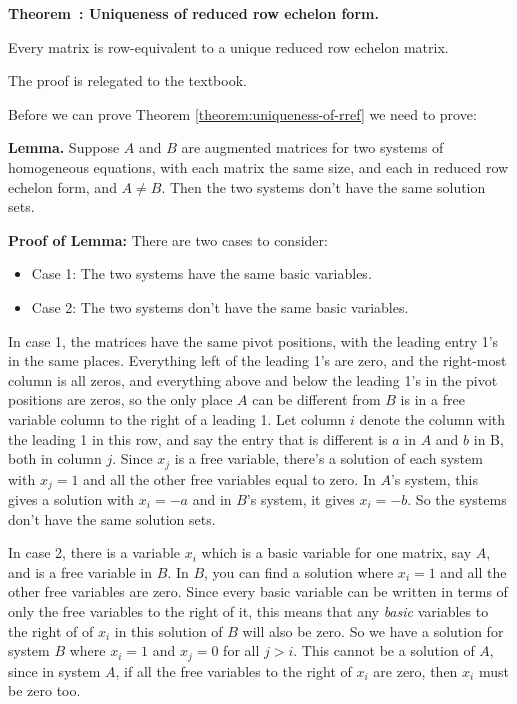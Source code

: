 \documentclass[11pt, letterpaper]{report}
\newenvironment{notes}{}{}
\newenvironment{book}{}{}
\newcounter{theorem}[chapter]
\newenvironment{theorem}[1][]{\refstepcounter{theorem}\begin{bbox}\par
    \noindent\textbf{Theorem~\thetheorem: #1}}{\end{bbox}}
\newlength\oldfboxsep%
\newlength\myminiwidth%
\newenvironment{bbox}{%
  \setlength\oldfboxsep\fboxsep
  \setlength{\fboxsep}{.1in}%
  \setlength\myminiwidth\linewidth%
  \addtolength\myminiwidth{-0.2in}%
  \vspace{0.1in}%
  \begin{lrbox}{\bboxbox}\begin{minipage}{\myminiwidth}%
    }{%
    \end{minipage}\end{lrbox}%
  \noindent\fbox{\usebox{\bboxbox}}\vspace{0.1in}\setlength\fboxsep\oldfboxsep%
}
\begin{document}
\begin{theorem}[Uniqueness of reduced row echelon form.] 
\label{theorem:uniqueness-of-rref}

Every matrix is row-equivalent to a unique reduced row echelon matrix.
\end{theorem}

\begin{notes}
The proof is relegated to the textbook.
\end{notes}

\begin{book}
Before we can prove Theorem \ref{theorem:uniqueness-of-rref} we need to prove:

\textbf{Lemma. } Suppose $A$ and $B$ are augmented matrices for two systems of homogeneous equations, with each matrix the same size, and each in reduced row echelon form, and $A \ne B$. Then the two systems don't have the same solution sets.

\textbf{Proof of Lemma:} There are two cases to consider:

\begin{itemize}
\item Case 1: The two systems have the same basic variables.
\item Case 2: The two systems don't have the same basic variables.
\end{itemize}

In case 1, the matrices have the same pivot positions, with the leading entry 1's in the same places. Everything left of the leading 1's are zero, and the right-most column is all zeros, and everything above and below the leading 1's in the pivot positions are zeros, so the only place $A$ can be different from $B$ is in a free variable column to the right of a leading 1. Let column $i$ denote the column with the leading 1 in this row, and say the entry that is different is $a$ in $A$ and $b$ in B, both in column $j$. Since $x_j$ is a free variable, there's a solution of each system with $x_j=1$ and all the other free variables equal to zero. In $A$'s system, this gives a solution with $x_i=-a$ and in $B$'s system, it gives $x_i=-b$. So the systems don't have the same solution sets.

In case 2, there is a variable $x_i$ which is a basic variable for one matrix, say $A$, and is a free variable in $B$. In $B$, you can find a solution where $x_i=1$ and all the other free variables are zero. Since every basic variable can be written in terms of only the free variables to the right of it,
this means that any \emph{basic} variables to the right of of $x_i$ in this solution of $B$ will also be zero. So we have a solution for system $B$ where $x_i=1$ and $x_j=0$ for all $j>i$. This cannot be a solution of $A$, since in system $A$, if all the free variables to the right of $x_i$ are zero, then $x_i$ must be zero too. \blacksquare


\end{book}
\end{document}
